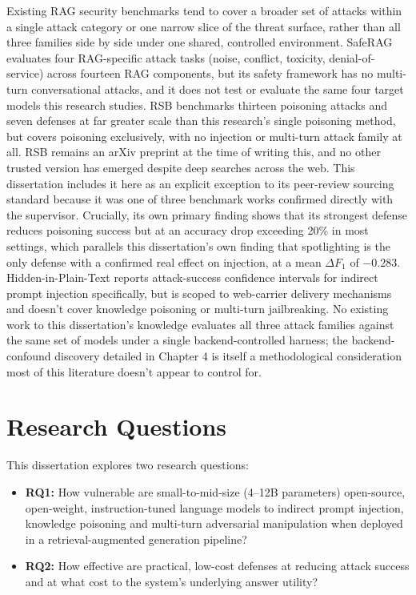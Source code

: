 Existing RAG security benchmarks tend to cover a broader set of attacks
within a single attack category or one narrow slice of the threat
surface, rather than all three families side by side under one shared,
controlled environment. SafeRAG \cite{liang2025saferag} evaluates four
RAG-specific attack tasks (noise, conflict, toxicity, denial-of-service)
across fourteen RAG components, but its safety framework has no
multi-turn conversational attacks, and it does not test or evaluate the
same four target models this research studies. RSB \cite{zhang2025rsb}
benchmarks thirteen poisoning attacks and seven defenses at far greater
scale than this research's single poisoning method, but covers poisoning
exclusively, with no injection or multi-turn attack family at all. RSB
remains an arXiv preprint at the time of writing this, and no other
trusted version has emerged despite deep searches across the web. This
dissertation includes it here as an explicit exception to its
peer-review sourcing standard because it was one of three benchmark
works confirmed directly with the supervisor. Crucially, its own primary
finding shows that its strongest defense reduces poisoning success but
at an accuracy drop exceeding 20\% in most settings, which parallels
this dissertation's own finding that spotlighting is the only defense
with a confirmed real effect on injection, at a mean $\Delta F_1$ of
$-0.283$. Hidden-in-Plain-Text \cite{guo2026hidden} reports
attack-success confidence intervals for indirect prompt injection
specifically, but is scoped to web-carrier delivery mechanisms and
doesn't cover knowledge poisoning or multi-turn jailbreaking. No
existing work to this dissertation's knowledge evaluates all three
attack families against the same set of models under a single
backend-controlled harness; the backend-confound discovery detailed in
Chapter 4 is itself a methodological consideration most of this
literature doesn't appear to control for.

\section{Research Questions}

This dissertation explores two research questions:

\begin{itemize}
    \item \textbf{RQ1:} How vulnerable are small-to-mid-size (4--12B
    parameters) open-source, open-weight, instruction-tuned language
    models to indirect prompt injection, knowledge poisoning and
    multi-turn adversarial manipulation when deployed in a
    retrieval-augmented generation pipeline?
    \item \textbf{RQ2:} How effective are practical, low-cost defenses
    at reducing attack success and at what cost to the system's
    underlying answer utility?
\end{itemize}

